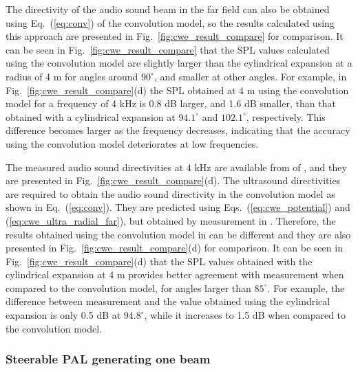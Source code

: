 The directivity of the audio sound beam in the far field can also be obtained using Eq.~(\ref{eq:conv}) of the convolution model, so the results calculated using this approach are presented in Fig.~\ref{fig:cwe_result_compare} for comparison. 
It can be seen in Fig.~\ref{fig:cwe_result_compare} that the SPL values calculated using the convolution model are slightly larger than the cylindrical expansion at a radius of 4 m for angles around $90^\circ$, and smaller at other angles. 
For example, in Fig.~\ref{fig:cwe_result_compare}(d) the SPL obtained at 4 m using the convolution model for a frequency of 4 kHz is 0.8 dB larger, and 1.6 dB smaller, than that obtained with a cylindrical expansion at $94.1^\circ$ and $102.1^\circ$, respectively. 
This difference becomes larger as the frequency decreases, indicating that the accuracy using the convolution model deteriorates at low frequencies.

The measured audio sound directivities at 4 kHz are available from  of \cite{Shi2015ConvolutionModelComputing}, and they are presented in Fig.~\ref{fig:cwe_result_compare}(d). 
The ultrasound directivities are required to obtain the audio sound directivity in the convolution model as shown in Eq.~(\ref{eq:conv}). 
They are predicted using Eqs.~(\ref{eq:cwe_potential}) and (\ref{eq:cwe_ultra_radial_far}), but obtained by measurement in \cite{Shi2015ConvolutionModelComputing}. 
Therefore, the results obtained using the convolution model in \cite{Shi2015ConvolutionModelComputing} can be different and they are also presented in Fig.~\ref{fig:cwe_result_compare}(d) for comparison. It can be seen in Fig.~\ref{fig:cwe_result_compare}(d) that the SPL values obtained with the cylindrical expansion at 4 m provides better agreement with measurement when compared to the convolution model, for angles larger than $85^\circ$. 
For example, the difference between measurement and the value obtained using the cylindrical expansion is only 0.5 dB at $94.8^\circ$, while it increases to 1.5 dB when compared to the convolution model. 


\subsubsection{Steerable PAL generating one beam}
\label{sec:cwe_one_beam}

